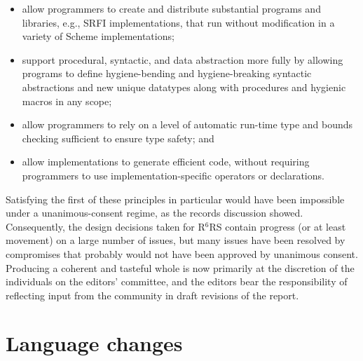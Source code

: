 \documentclass{acm_proc_article-sp}
\newcommand{\rn}[1]{R$^{#1}$RS}
\begin{document}
\begin{itemize}
\item allow programmers to create and distribute substantial programs
  and libraries, e.g., SRFI implementations, that run without
  modification in a variety of Scheme implementations;
  
\item support procedural, syntactic, and data abstraction more fully
  by allowing programs to define hygiene-bending and hygiene-breaking
  syntactic abstractions and new unique datatypes along with
  procedures and hygienic macros in any scope;
  
\item allow programmers to rely on a level of automatic run-time type
  and bounds checking sufficient to ensure type safety; and

\item allow implementations to generate efficient code, without
  requiring programmers to use implementation-specific operators or
  declarations.
\end{itemize}
%
Satisfying the first of these principles in particular would have been
impossible under a unanimous-consent regime, as the records discussion
showed.  Consequently, the design decisions taken for \rn{6} contain
progress (or at least movement) on a large number of issues, but many
issues have been resolved by compromises that probably would not have
been approved by unanimous consent.  Producing a coherent and tasteful
whole is now primarily at the discretion of the individuals on the
editors' committee, and the editors bear the responsibility of
reflecting input from the community in draft revisions of the report.

\section{Language changes}
\label{sec:changes}
\end{document}
